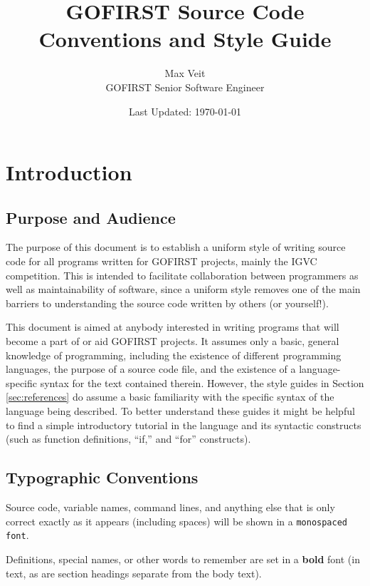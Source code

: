 \documentclass[12pt]{article}
\newcommand{\textdef}[1]{\textbf{#1}}
\begin{document}
\title{GOFIRST Source Code Conventions and Style Guide}
\author{Max Veit\\
GOFIRST Senior Software Engineer}
\date{Last Updated: \today}

\maketitle
\tableofcontents
\thispagestyle{fancy}

\section{Introduction}
\subsection{Purpose and Audience}
The purpose of this document is to establish a uniform style of writing source code for all programs written for GOFIRST projects, mainly the IGVC competition. This is intended to facilitate collaboration between programmers as well as maintainability of software, since a uniform style removes one of the main barriers to understanding the source code written by others (or yourself!).

This document is aimed at anybody interested in writing programs that will become a part of or aid GOFIRST projects. It assumes only a basic, general knowledge of programming, including the existence of different programming languages, the purpose of a source code file, and the existence of a language-specific syntax for the text contained therein. However, the style guides in Section \ref{sec:references} do assume a basic familiarity with the specific syntax of the language being described. To better understand these guides it might be helpful to find a simple introductory tutorial in the language and its syntactic constructs (such as function definitions, ``if,'' and ``for'' constructs).

\subsection{Typographic Conventions}
Source code, variable names, command lines, and anything else that is only correct exactly as it appears (including spaces) will be shown in a \texttt{monospaced font}.

Definitions, special names, or other words to remember are set in a \textdef{bold} font (in text, as are section headings separate from the body text).
\end{document}
